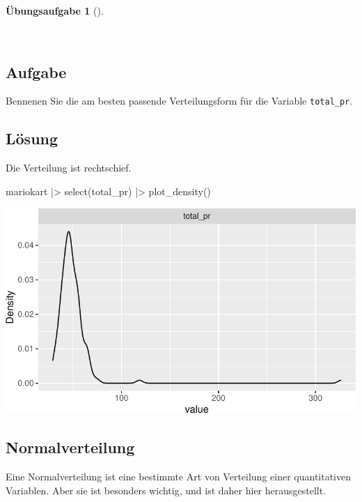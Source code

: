 \documentclass[
  a4paper,
  DIV=11]{scrreprt}
\newenvironment{Shaded}{\begin{snugshade}}{\end{snugshade}}
\newcommand{\FunctionTok}[1]{\textcolor[rgb]{0.28,0.35,0.67}{#1}}
\newcommand{\NormalTok}[1]{\textcolor[rgb]{0.00,0.23,0.31}{#1}}
\newcommand{\SpecialCharTok}[1]{\textcolor[rgb]{0.37,0.37,0.37}{#1}}
\theoremstyle{definition}
\newtheorem{exercise}{Übungsaufgabe}[chapter]
\theoremstyle{definition}
\theoremstyle{definition}
\theoremstyle{remark}
\begin{document}
\begin{exercise}[]\protect\hypertarget{exr-verteilungsform-total-pr}{}\label{exr-verteilungsform-total-pr}

~

\subsection{Aufgabe}

Bennenen Sie die am besten passende Verteilungsform für die Variable
\texttt{total\_pr}.

\subsection{Lösung}

Die Verteilung ist rechtschief.

\begin{Shaded}
\begin{Highlighting}[]
\NormalTok{mariokart }\SpecialCharTok{|\textgreater{}} 
  \FunctionTok{select}\NormalTok{(total\_pr) }\SpecialCharTok{|\textgreater{}} 
  \FunctionTok{plot\_density}\NormalTok{()}
\end{Highlighting}
\end{Shaded}

\includegraphics{040-verbildlichen_files/figure-pdf/unnamed-chunk-17-1.pdf}

\end{exercise}

\subsection{Normalverteilung}\label{normalverteilung}

Eine Normalverteilung ist eine bestimmte Art von Verteilung einer
quantitativen Variablen. Aber sie ist besonders wichtig, und ist daher
hier herausgestellt.
\end{document}
